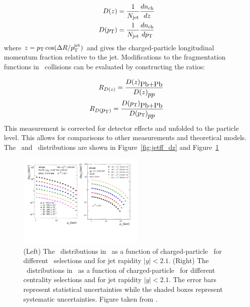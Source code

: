 \begin{align}
\mbox{$D(z)$} = \frac{1}{\mbox{$N_{\mathrm{jet}}$}} \frac{d\mbox{$n_{\mathrm{ch}}$}}{dz} \\
\mbox{$D(\mbox{$p_{\mathrm{T}}$})$} = \frac{1}{\mbox{$N_{\mathrm{jet}}$}} \frac{d\mbox{$n_{\mathrm{ch}}$}}{d\mbox{$p_{\mathrm{T}}$}}
\end{align}
where $z = \mbox{$p_{\mathrm{T}}$} \cos(\Delta R / \mbox{$p_{\mathrm{T}}^{\mathrm{jet}}$})$ and gives the charged-particle longitudinal momentum fraction relative to the jet. Modifications to the fragmentation functions in \pbpb\ collisions can be evaluated by constructing the ratios: 

\begin{align}
\mbox{$R_{D(z)}$} = \frac{\mbox{$D(z)$}_{\mbox{Pb+Pb}}}{\mbox{$D(z)$}_{\mbox{$pp$}}} \\
\mbox{$R_{D(\mbox{$p_{\mathrm{T}}$})}$} = \frac{\mbox{$D(\mbox{$p_{\mathrm{T}}$})$}_{\mbox{Pb+Pb}}}{\mbox{$D(\mbox{$p_{\mathrm{T}}$})$}_{\mbox{$pp$}}} 
\end{align}
This measurement is corrected for detector effects and unfolded to the particle level. This allows for comparisons to other measurements and theoretical models. The \Dz\ and \Dpt\ distributions are shown in Figure~\ref{fig:jetff_dz} and Figure~\ref{fig:jetff_dpt} 

\begin{figure}[htbp]
\begin{center}
\includegraphics[width=0.55\textwidth]{figures/jetMeasurements/jetff_dpt}
\caption{(Left) The \Dpt\ distributions in \pp\ as a function of charged-particle \pt\ for different \ptjet\ selections and for jet rapidity $|y| < 2.1$. (Right) The \Dpt\ distributions in \pbpb\ as a function of charged-particle \pt\ for different centrality selections and for jet rapidity $|y| < 2.1$. The error bars represent statistical uncertainties while the shaded boxes represent systematic uncertainties. Figure taken from \cite{PhysRevC.98.024908}.}
\label{fig:jetff_dpt}
\end{center}
\end{figure}


